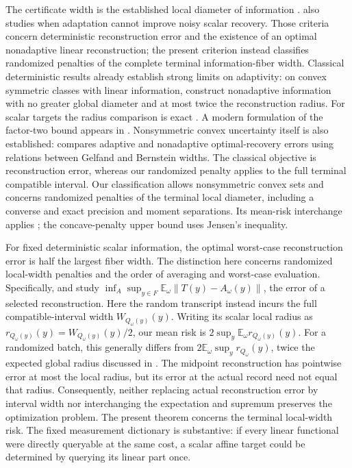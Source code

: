\documentclass[12pt]{article}
\begin{document}
The certificate width is the established local diameter of information
\citep[Section~4.1]{novak2008}.
\citet[Theorems~2--3 and~5]{osipenko} also studies when adaptation cannot
improve noisy scalar recovery. Those criteria concern deterministic
reconstruction error and the existence of an optimal nonadaptive linear
reconstruction; the present criterion instead classifies randomized
penalties of the complete terminal information-fiber width.
Classical deterministic results already establish strong limits on
adaptivity: on convex symmetric classes with linear information,
\citet[Theorem~4.4]{novak2008} construct nonadaptive information with
no greater global diameter and at most twice the reconstruction radius.
For scalar targets the radius comparison is exact
\citep[Theorem~4.5]{novak2008}. A modern formulation of the factor-two
bound appears in \citet[Proposition~4.1]{krieg2025}.
Nonsymmetric convex uncertainty itself is also established:
\citet{novak1995} compares adaptive and nonadaptive optimal-recovery
errors using relations between Gelfand and Bernstein widths. The
classical objective is reconstruction error, whereas our randomized
penalty applies to the full terminal compatible interval. Our classification allows nonsymmetric convex sets and concerns randomized
penalties of the terminal local diameter, including a converse and exact
precision and moment separations. Its mean-risk interchange applies
\citet[Theorem~3.4]{sion1958}; the concave-penalty upper bound uses Jensen's
inequality.

For fixed deterministic scalar information, the optimal worst-case
reconstruction error is half the largest fiber width. The distinction here
concerns randomized local-width penalties and the order of averaging and
worst-case evaluation. Specifically, \citet[Section~2]{krieg2025}
and \citet[Section~9.1, Eq.~(9.15), author manuscript v2]{krieg2026}
study $\inf_A\sup_{y\in F}\mathbb E_\omega
\lVert T(y)-A_\omega(y)\rVert$, the error of a selected reconstruction.
Here the random transcript instead incurs the full compatible-interval
width $W_{Q_\omega(y)}(y)$.
Writing its scalar local radius as $r_{Q_\omega(y)}(y)=W_{Q_\omega(y)}(y)/2$,
our mean risk is $2\sup_y\mathbb E_\omega r_{Q_\omega(y)}(y)$.
For a randomized batch, this generally differs from
$2\mathbb E_\omega\sup_y r_{Q_\omega}(y)$, twice the expected global radius
discussed in \citet[Eq.~(2.4), Remark~6.1 and Section~6.1, author manuscript v2]{krieg2026}.
The midpoint reconstruction has pointwise error at most the local radius,
but its error at the actual record need not equal that radius. Consequently,
neither replacing actual reconstruction error by interval width nor
interchanging the expectation and supremum preserves the optimization
problem. The present theorem concerns the terminal local-width risk.
The fixed measurement dictionary is substantive: if every linear
functional were directly queryable at the same cost, a scalar affine
target could be determined by querying its linear part once.
\end{document}
